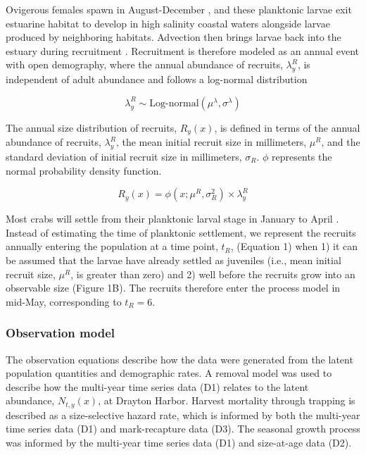 \documentclass{article}
\begin{document}
Ovigerous females spawn in August-December \parencite{klassen2007biological}, and these planktonic larvae exit estuarine habitat to develop in high salinity coastal waters alongside larvae produced by neighboring habitats. Advection then brings larvae back into the estuary during recruitment \parencite{young2019life}. Recruitment is therefore modeled as an annual event with open demography, where the annual abundance of recruits, $\lambda^R_y$, is independent of adult abundance and follows a log-normal distribution  

\begin{equation}
\lambda^R_y \sim \text{Log-normal}(\mu^{\lambda}, \sigma^{\lambda})
\end{equation}

The annual size distribution of recruits, $R_y(x)$, is defined in terms of the annual abundance of recruits, $\lambda^R_y$, the mean initial recruit size in millimeters, $\mu^R$, and the standard deviation of initial recruit size in millimeters, $\sigma_R$. $\phi$ represents the normal probability density function.

\begin{equation}
R_y(x) = \phi(x; \mu^R, \sigma^2_R) \times \lambda^R_y
\end{equation}

Most crabs will settle from their planktonic larval stage in January to April \parencite{yamada2005growth}. Instead of estimating the time of planktonic settlement, we represent the recruits annually entering the population at a time point, $t_R$, (Equation 1) when 1) it can be assumed that the larvae have already settled as juveniles (i.e., mean initial recruit size, $\mu^R$, is greater than zero) and 2) well before the recruits grow into an observable size (Figure 1B). The recruits therefore enter the process model in mid-May, corresponding to $t_R=6$. 

\subsubsection{Observation model}

The observation equations describe how the data were generated from the latent population quantities and demographic rates. A removal model was used to describe how the multi-year time series data (D1) relates to the latent abundance, $N_{t,y}(x)$, at Drayton Harbor. Harvest mortality through trapping is described as a size-selective hazard rate, which is informed by both the multi-year time series data (D1) and mark-recapture data (D3). The seasonal growth process was informed by the multi-year time series data (D1) and size-at-age data (D2).
\end{document}
